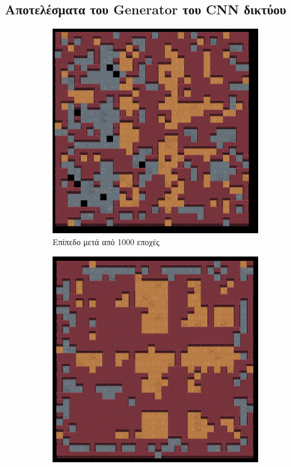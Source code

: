 \subsection{Αποτελέσματα του Generator του CNN δικτύου}
\begin{figure}[H]
\begin{subfigure}{.5\textwidth}
  \centering
  \includegraphics[width=.8\linewidth]{../images/result_images/cnn-gan/generator_1000.png}
  \caption{Επίπεδο μετά από 1000 εποχές}
  \label{fig:sfig1}
\end{subfigure}%
\begin{subfigure}{.5\textwidth}
  \centering
  \includegraphics[width=.8\linewidth]{../images/result_images/cnn-gan/generator_3000.png}

\end{subfigure}
\end{figure}
